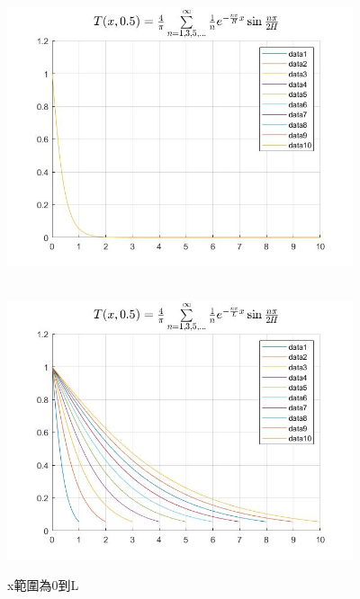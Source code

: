 \documentclass{article}
\begin{document}
    \begin{figure}
        \centering
        \includegraphics[width=4in]{./test.jpg}
        \caption{x範圍為0到L}
        \\
        \includegraphics[width=4in]{./test2.jpg}
    \end{figure}
\end{document}
